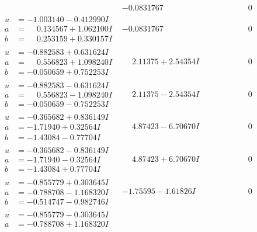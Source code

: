 \documentclass[1p]{elsarticle_modified}
\theoremstyle{definition}
\begin{document}
$$\begin{array}{c|c|c}
 & -0.0831767\phantom{ +0.000000I} & \phantom{-0.000000 } 0 \\ \hline\begin{aligned}
u &= -1.003140 - 0.412990 I \\
a &= \phantom{-}0.134567 + 1.062100 I \\
b &= \phantom{-}0.253159 + 0.330157 I\end{aligned}
 & -0.0831767\phantom{ +0.000000I} & \phantom{-0.000000 } 0 \\ \hline\begin{aligned}
u &= -0.882583 + 0.631624 I \\
a &= \phantom{-}0.556823 + 1.098240 I \\
b &= -0.050659 + 0.752253 I\end{aligned}
 & \phantom{-}2.11375 + 2.54354 I & \phantom{-0.000000 } 0 \\ \hline\begin{aligned}
u &= -0.882583 - 0.631624 I \\
a &= \phantom{-}0.556823 - 1.098240 I \\
b &= -0.050659 - 0.752253 I\end{aligned}
 & \phantom{-}2.11375 - 2.54354 I & \phantom{-0.000000 } 0 \\ \hline\begin{aligned}
u &= -0.365682 + 0.836149 I \\
a &= -1.71940 + 0.32564 I \\
b &= -1.43084 - 0.77704 I\end{aligned}
 & \phantom{-}4.87423 - 6.70670 I & \phantom{-0.000000 } 0 \\ \hline\begin{aligned}
u &= -0.365682 - 0.836149 I \\
a &= -1.71940 - 0.32564 I \\
b &= -1.43084 + 0.77704 I\end{aligned}
 & \phantom{-}4.87423 + 6.70670 I & \phantom{-0.000000 } 0 \\ \hline\begin{aligned}
u &= -0.855779 + 0.303645 I \\
a &= -0.788708 - 1.168320 I \\
b &= -0.514747 - 0.982746 I\end{aligned}
 & -1.75595 - 1.61826 I & \phantom{-0.000000 } 0 \\ \hline\begin{aligned}
u &= -0.855779 - 0.303645 I \\
a &= -0.788708 + 1.168320 I \\

\end{aligned}
\end{array}$$
\end{document}
